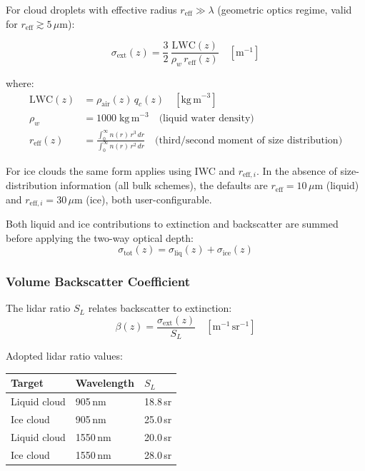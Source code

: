 \documentclass[11pt,letterpaper]{article}
\begin{document}
For cloud droplets with effective radius $r_\mathrm{eff} \gg \lambda$ (geometric optics regime,
valid for $r_\mathrm{eff} \gtrsim 5\,\mu\mathrm{m}$):

\begin{equation}
  \sigma_\mathrm{ext}(z) = \frac{3}{2}\,\frac{\mathrm{LWC}(z)}{\rho_w\,r_\mathrm{eff}(z)}
  \quad [\mathrm{m}^{-1}]
  \label{eq:sigma_ext_simple}
\end{equation}

\noindent where:
\begin{align*}
  \mathrm{LWC}(z) &= \rho_\mathrm{air}(z)\,q_c(z) \quad [\mathrm{kg\,m}^{-3}] \\
  \rho_w &= 1000\;\mathrm{kg\,m}^{-3} \quad \text{(liquid water density)} \\
  r_\mathrm{eff}(z) &= \frac{\int_0^\infty n(r)\,r^3\,dr}{\int_0^\infty n(r)\,r^2\,dr}
  \quad \text{(third/second moment of size distribution)}
\end{align*}

For ice clouds the same form applies using IWC and $r_{\mathrm{eff},i}$.
In the absence of size-distribution information (all bulk schemes),
the defaults are $r_\mathrm{eff} = 10\,\mu\mathrm{m}$ (liquid) and
$r_{\mathrm{eff},i} = 30\,\mu\mathrm{m}$ (ice), both user-configurable.

Both liquid and ice contributions to extinction and backscatter are summed before
applying the two-way optical depth:
\begin{equation}
  \sigma_\mathrm{tot}(z) = \sigma_\mathrm{liq}(z) + \sigma_\mathrm{ice}(z)
\end{equation}

\subsubsection{Volume Backscatter Coefficient}

The lidar ratio $S_L$ relates backscatter to extinction:
\begin{equation}
  \beta(z) = \frac{\sigma_\mathrm{ext}(z)}{S_L}
  \quad [\mathrm{m}^{-1}\,\mathrm{sr}^{-1}]
  \label{eq:beta_simple}
\end{equation}

\noindent Adopted lidar ratio values:
\begin{center}
\begin{tabular}{lll}
\toprule
Target & Wavelength & $S_L$ \\
\midrule
Liquid cloud & 905\,nm  & 18.8\,sr \\
Ice cloud    & 905\,nm  & 25.0\,sr \\
Liquid cloud & 1550\,nm & 20.0\,sr \\
Ice cloud    & 1550\,nm & 28.0\,sr \\
\bottomrule
\end{tabular}
\end{center}
\end{document}
